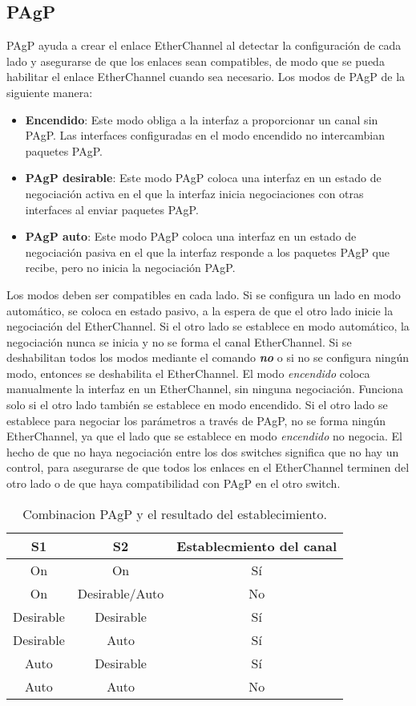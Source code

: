 \documentclass[
	12pt, %
	fleqn, %
	a4paper, %
	oneside, %
]{LegrandOrangeBook}
\begin{document}
\subsection{PAgP}
PAgP ayuda a crear el enlace EtherChannel al detectar la configuración de cada lado y asegurarse de que los enlaces sean  compatibles, de modo que se pueda habilitar el enlace EtherChannel cuando sea necesario. Los modos de PAgP de la siguiente  manera:
\begin{itemize}
\item \textbf{Encendido}: Este modo obliga a la interfaz a proporcionar un canal sin PAgP. Las interfaces configuradas en el modo encendido no intercambian paquetes PAgP.
\item \textbf{PAgP desirable}: Este modo PAgP coloca una interfaz en un estado de negociación activa en el que la interfaz inicia negociaciones con otras interfaces al enviar paquetes PAgP.
\item \textbf{PAgP auto}: Este modo PAgP coloca una interfaz en un estado de negociación pasiva en el que la interfaz responde a los paquetes PAgP que recibe, pero no inicia la negociación PAgP.
\end{itemize}
Los modos deben ser compatibles en cada lado. Si se configura un lado en modo automático, se coloca en estado pasivo, a la  espera de que el otro lado inicie la negociación del EtherChannel. Si el otro lado se establece en modo automático, la  negociación nunca se inicia y no se forma el canal EtherChannel. Si se deshabilitan todos los modos mediante el comando \textit{\textbf{no}} o  si no se configura ningún modo, entonces se deshabilita el EtherChannel. El modo \textit{encendido} coloca manualmente la interfaz en  un EtherChannel, sin ninguna negociación. Funciona solo si el otro lado también se establece en modo encendido. Si el otro lado  se establece para negociar los parámetros a través de PAgP, no se forma ningún EtherChannel, ya que el lado que se establece  en modo \textit{encendido} no negocia. El hecho de que no haya negociación entre los dos switches significa que no hay un control, para asegurarse de que todos los enlaces en el EtherChannel terminen del otro lado o de que haya compatibilidad con PAgP en  el otro switch.
\begin{table}[H]
\centering
\begin{tabular}{|c|c|c|}
\hline
\rowcolor[HTML]{9698ED} 
S1        & S2             & Establecmiento del canal \\ \hline
On        & On             & Sí                       \\ \hline
On        & Desirable/Auto & No                       \\ \hline
Desirable & Desirable      & Sí                       \\ \hline
Desirable & Auto           & Sí                       \\ \hline
Auto      & Desirable      & Sí                       \\ \hline
Auto      & Auto           & No                       \\ \hline
\end{tabular}
\caption{Combinacion PAgP y el resultado del establecimiento.}
\end{table}
\end{document}
